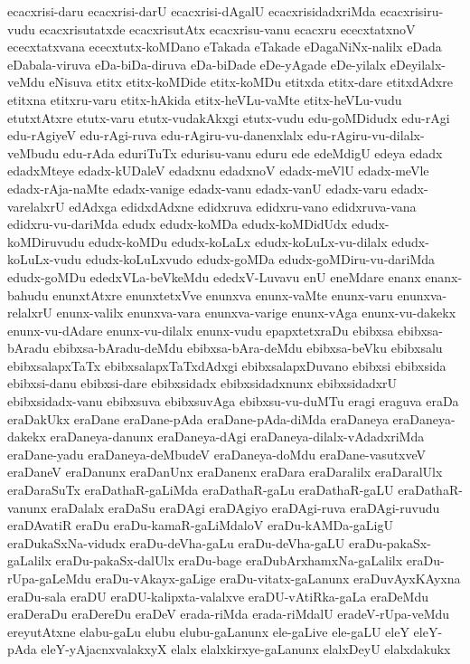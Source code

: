 {ecacxrisi-daru
ecacxrisi-darU
ecacxrisi-dAgalU
ecacxrisidadxriMda
ecacxrisiru-vudu
ecacxrisutatxde
ecacxrisutAtx
ecacxrisu-vanu
ecacxru
ececxtatxnoV
ececxtatxvana
ececxtutx-koMDano
eTakada
eTakade
eDagaNiNx-nalilx
eDada
eDabala-viruva
eDa-biDa-diruva
eDa-biDade
eDe-yAgade
eDe-yilalx
eDeyilalx-veMdu
eNisuva
etitx
etitx-koMDide
etitx-koMDu
etitxda
etitx-dare
etitxdAdxre
etitxna
etitxru-varu
etitx-hAkida
etitx-heVLu-vaMte
etitx-heVLu-vudu
etutxtAtxre
etutx-varu
etutx-vudakAkxgi
etutx-vudu
edu-goMDidudx
edu-rAgi
edu-rAgiyeV
edu-rAgi-ruva
edu-rAgiru-vu-danenxlalx
edu-rAgiru-vu-dilalx-veMbudu
edu-rAda
eduriTuTx
edurisu-vanu
eduru
ede
edeMdigU
edeya
edadx
edadxMteye
edadx-kUDaleV
edadxnu
edadxnoV
edadx-meVlU
edadx-meVle
edadx-rAja-naMte
edadx-vanige
edadx-vanu
edadx-vanU
edadx-varu
edadx-varelalxrU
edAdxga
edidxdAdxne
edidxruva
edidxru-vano
edidxruva-vana
edidxru-vu-dariMda
edudx
edudx-koMDa
edudx-koMDidUdx
edudx-koMDiruvudu
edudx-koMDu
edudx-koLaLx
edudx-koLuLx-vu-dilalx
edudx-koLuLx-vudu
edudx-koLuLxvudo
edudx-goMDa
edudx-goMDiru-vu-dariMda
edudx-goMDu
ededxVLa-beVkeMdu
ededxV-Luvavu
enU
eneMdare
enanx
enanx-bahudu
enunxtAtxre
enunxtetxVve
enunxva
enunx-vaMte
enunx-varu
enunxva-relalxrU
enunx-valilx
enunxva-vara
enunxva-varige
enunx-vAga
enunx-vu-dakekx
enunx-vu-dAdare
enunx-vu-dilalx
enunx-vudu
epapxtetxraDu
ebibxsa
ebibxsa-bAradu
ebibxsa-bAradu-deMdu
ebibxsa-bAra-deMdu
ebibxsa-beVku
ebibxsalu
ebibxsalapxTaTx
ebibxsalapxTaTxdAdxgi
ebibxsalapxDuvano
ebibxsi
ebibxsida
ebibxsi-danu
ebibxsi-dare
ebibxsidadx
ebibxsidadxnunx
ebibxsidadxrU
ebibxsidadx-vanu
ebibxsuva
ebibxsuvAga
ebibxsu-vu-duMTu
eragi
eraguva
eraDa
eraDakUkx
eraDane
eraDane-pAda
eraDane-pAda-diMda
eraDaneya
eraDaneya-dakekx
eraDaneya-danunx
eraDaneya-dAgi
eraDaneya-dilalx-vAdadxriMda
eraDane-yadu
eraDaneya-deMbudeV
eraDaneya-doMdu
eraDane-vasutxveV
eraDaneV
eraDanunx
eraDanUnx
eraDanenx
eraDara
eraDaralilx
eraDaralUlx
eraDaraSuTx
eraDathaR-gaLiMda
eraDathaR-gaLu
eraDathaR-gaLU
eraDathaR-vanunx
eraDalalx
eraDaSu
eraDAgi
eraDAgiyo
eraDAgi-ruva
eraDAgi-ruvudu
eraDAvatiR
eraDu
eraDu-kamaR-gaLiMdaloV
eraDu-kAMDa-gaLigU
eraDukaSxNa-vidudx
eraDu-deVha-gaLu
eraDu-deVha-gaLU
eraDu-pakaSx-gaLalilx
eraDu-pakaSx-dalUlx
eraDu-bage
eraDubArxhamxNa-gaLalilx
eraDu-rUpa-gaLeMdu
eraDu-vAkayx-gaLige
eraDu-vitatx-gaLanunx
eraDuvAyxKAyxna
eraDu-sala
eraDU
eraDU-kalipxta-valalxve
eraDU-vAtiRka-gaLa
eraDeMdu
eraDeraDu
eraDereDu
eraDeV
erada-riMda
erada-riMdalU
eradeV-rUpa-veMdu
ereyutAtxne
elabu-gaLu
elubu
elubu-gaLanunx
ele-gaLive
ele-gaLU
eleY
eleY-pAda
eleY-yAjacnxvalakxyX
elalx
elalxkirxye-gaLanunx
elalxDeyU
elalxdakukx
}
